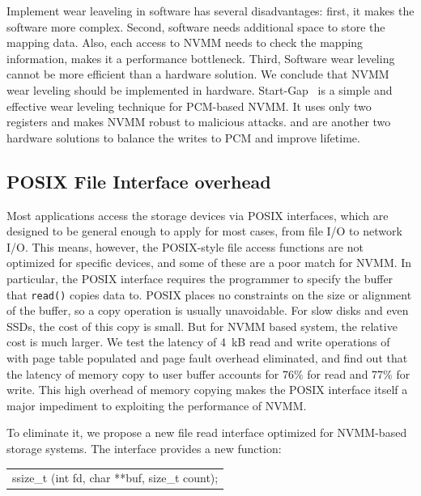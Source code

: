 Implement wear leaveling in software has several disadvantages: first, it makes
the software more complex. Second, software needs additional space to store
the mapping data.
Also, each access to NVMM needs to check the mapping information, makes it
a performance bottleneck.
Third, Software wear leveling cannot be more efficient
than a hardware solution. We conclude that NVMM wear leveling should be
implemented in hardware. Start-Gap~\cite{startgap1} is a simple and effective
wear leveling technique for PCM-based NVMM. It uses only two registers and
makes NVMM robust to malicious attacks. \cite{secrefresh} and \cite{freep}
are another two hardware solutions to balance the writes to PCM and improve
lifetime.

\subsection{POSIX File Interface overhead}
\label{sec:noposix}

Most applications access the storage devices via POSIX interfaces, which are
designed to be general enough to apply for most cases, from file I/O
to network I/O.
This means, however, the POSIX-style file access functions are not optimized
for specific devices, and some of these are a poor match for NVMM.
In particular, the POSIX interface
requires the programmer to specify the buffer that \texttt{read()} copies data
to. POSIX places no constraints on the size
or alignment of the buffer, so a copy operation is usually unavoidable.  For
slow disks and even SSDs, the cost of this copy is small.
But for NVMM based system, the relative cost is much larger.
We test the latency of 4~kB read and
write operations of \DAChell{} with page table populated and page fault overhead
eliminated, and find out that the latency of memory copy to user buffer
accounts for 76\% for read and 77\% for write.
This high overhead of memory copying makes the POSIX interface
itself a major impediment to exploiting the performance of NVMM.

To eliminate it, we propose a new file read interface optimized for
NVMM-based storage systems.  The interface provides a new function:


\vspace{1em}
\begin{tabular}{l}
ssize\_t \grb{}(int fd, char **buf, size\_t count);\\
\end{tabular}
\vspace{1em}

